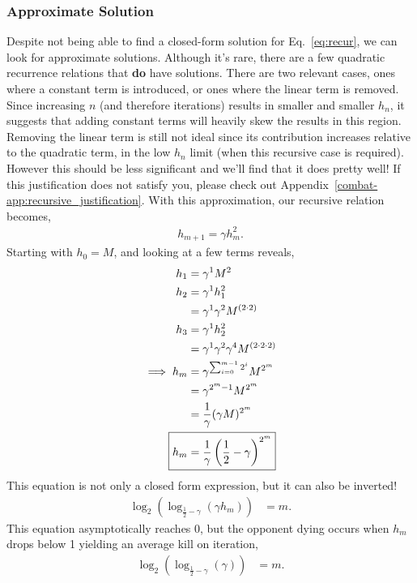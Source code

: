 		\subsubsection{Approximate Solution}
				Despite not being able to find a closed-form solution for Eq.~\ref{eq:recur}, we can look for approximate solutions. Although it's rare, there are a few quadratic recurrence relations that \textbf{do} have solutions. There are two relevant cases, ones where a constant term is introduced, or ones where the linear term is removed. Since increasing $n$ (and therefore iterations) results in smaller and smaller $h_n$, it suggests that adding constant terms will heavily skew the results in this region. Removing the linear term is still not ideal since its contribution increases relative to the quadratic term, in the low $h_n$ limit (when this recursive case is required). However this should be less significant and we'll find that it does pretty well! If this justification does not satisfy you, please check out Appendix~\ref{combat-app:recursive_justification}. With this approximation, our recursive relation becomes,
				\begin{align}\label{eq:simplified_recursion}
					h_{m+1} = \gamma h_m^2.
				\end{align}
				Starting with $h_0 = M$, and looking at a few terms reveals,
				\begin{align}
					h_{1} &= \gamma^1 M^2\\
					h_{2} &= \gamma^1 h_1^2\\
						&= \gamma^1 \gamma^2 M^{(2\cdot2)}\\
					h_{3} &= \gamma^1 h_2^2\\
						&= \gamma^1 \gamma^2 \gamma^4 M^{(2\cdot2\cdot2)}\\
					\implies h_m &= \gamma^{\sum_{i=0}^{m-1} 2^i} M^{2^m}\\
								&= \gamma^{2^m-1} M^{2^m}\\
								&= \frac{1}{\gamma}(\gamma M)^{2^m}\\
							\Aboxed{h_m &= \frac{1}{\gamma}\left(\frac{1}{2} - \gamma\right)^{2^m}}
				\end{align}
				This equation is not only a closed form expression, but it can also be inverted!
				\begin{align}\label{eq:approximate_m}
					\log_2(\log_{\frac{1}{2} - \gamma} (\gamma h_m)) &= m.
				\end{align}
				This equation asymptotically reaches 0, but the opponent dying occurs when $h_m$ drops below 1 yielding an average kill on iteration,
				\begin{align}
					\log_2(\log_{\frac{1}{2} - \gamma} (\gamma)) &= m.
				\end{align}

